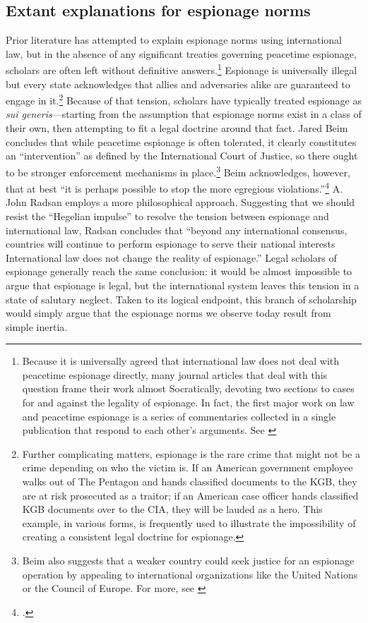 \documentclass[14pt]{extarticle}
\begin{document}
\subsection{Extant explanations for espionage norms}
Prior literature has attempted to explain espionage norms using international law, but in the absence of any significant treaties governing peacetime espionage, scholars are often left without definitive answers.\footnote{Because it is universally agreed that international law does not deal with peacetime espionage directly, many journal articles that deal with this question frame their work almost Socratically, devoting two sections to cases for and against the legality of espionage. In fact, the first major work on law and peacetime espionage is a series of commentaries collected in a single publication that respond to each other's arguments. See \cite{wright_essays_1962}} Espionage is universally illegal but every state acknowledges that allies and adversaries alike are guaranteed to engage in it.\footnote{Further complicating matters, espionage is the rare crime that might not be a crime depending on who the victim is. If an American government employee walks out of The Pentagon and hands classified documents to the KGB, they are at risk prosecuted as a traitor; if an American case officer hands classified KGB documents over to the CIA, they will be lauded as a hero. This example, in various forms, is frequently used to illustrate the impossibility of creating a consistent legal doctrine for espionage.} Because of that tension, scholars have typically treated espionage as \emph{sui generis}---starting from the assumption that espionage norms exist in a class of their own, then attempting to fit a legal doctrine around that fact. Jared Beim concludes that while peacetime espionage is often tolerated, it clearly constitutes an \enquote{intervention} as defined by the International Court of Justice, so there ought to be stronger enforcement mechanisms in place.\footnote{Beim also suggests that a weaker country could seek justice for an espionage operation by appealing to international organizations like the United Nations or the Council of Europe. For more, see \cite{beim_enforcing_2018}} Beim acknowledges, however, that at best \enquote{it is perhaps possible to stop the more egregious violations.}\footcite[p.~672]{beim_enforcing_2018} A. John Radsan employs a more philosophical approach. Suggesting that we should resist the \enquote{Hegelian impulse} to resolve the tension between espionage and international law, Radsan concludes that \enquote{beyond any international consensus, countries will continue to perform espionage to serve their national interests \textelp{} International law does not change the reality of espionage.} Legal scholars of espionage generally reach the same conclusion: it would be almost impossible to argue that espionage is legal, but the international system leaves this tension in a state of salutary neglect. Taken to its logical endpoint, this branch of scholarship would simply argue that the espionage norms we observe today result from simple inertia.
\end{document}
